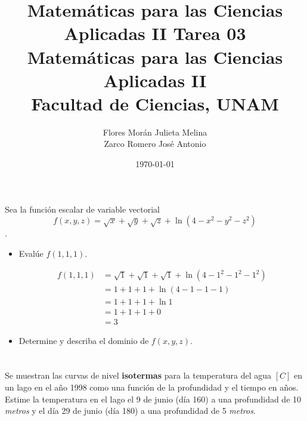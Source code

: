 \documentclass[12pt]{article}
\title{Matemáticas para las Ciencias Aplicadas II}
\title{
        \textbf{Tarea 03} \\
        \vspace{1ex}
        \large Matemáticas para las Ciencias Aplicadas II \\
        Facultad de Ciencias, UNAM}
\date{\today}
\author{Flores Morán Julieta Melina \\ Zarco Romero José Antonio}
\begin{document}
\maketitle

\section{}

Sea la función escalar de variable vectorial $$f(x,y,z)= \sqrt{x} +\sqrt{y} +\sqrt{z} + \ln{(4-x^2-y^2-z^2)}$$.

\begin{itemize}[format=\textbf]

\item Evalúe $f(1,1,1)$.

\begin{align*}
f(1,1,1)
&= \sqrt{1} +\sqrt{1} +\sqrt{1} + \ln{(4-1^2-1^2-1^2)} \\
&= 1+1+1+ \ln{(4-1-1-1)} \\
&= 1+1+1+ \ln{1} \\
&= 1+1+1+0 \\
&= 3
\end{align*}

\item Determine y describa el dominio de $f(x, y, z)$.

\end{itemize}

\section{}

 Se muestran las curvas de nivel \textbf{isotermas} para la temperatura del agua $[C]$ en un lago en el año 1998 como una función de la profundidad y el tiempo en años. Estime la temperatura en el lago el 9 de junio (día 160) a una profundidad de 10 \textit{metros} y el día 29 de junio (día 180) a una profundidad de 5 \textit{metros}.

\section{}
\end{document}

